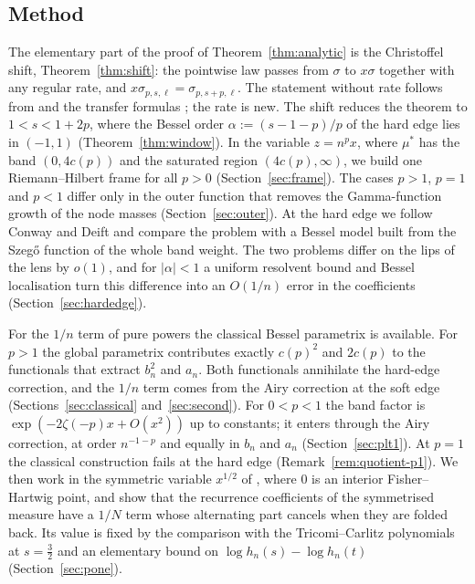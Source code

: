 \subsection{Method}\label{sec:strategy}
The elementary part of the proof of Theorem~\ref{thm:analytic} is the Christoffel shift, Theorem~\ref{thm:shift}: the
pointwise law passes from $\sigma$ to $x\sigma$ together with any regular rate, and $x\sigma_{p,s,\ell}=\sigma_{p,s+p,\ell}$.
The statement without rate follows from \cite[Proposition~2.1]{DPQ} and the transfer formulas \cite[\S1]{DD}; the rate is
new. The shift reduces the theorem to $1<s<1+2p$, where the Bessel order $\alpha:=(s-1-p)/p$ of the hard edge lies in
$(-1,1)$ (Theorem~\ref{thm:window}). In the variable $z=n^px$, where $\mu^*$ has the band $(0,4c(p))$ and the saturated
region $(4c(p),\infty)$, we build one Riemann--Hilbert frame for all $p>0$ (Section~\ref{sec:frame}). The cases $p>1$, $p=1$ and $p<1$ differ only in the outer function that removes the
Gamma-function growth of the node masses (Section~\ref{sec:outer}). At the hard
edge we follow Conway and Deift and compare the problem with a Bessel model built from the Szeg\H{o} function of the
whole band weight. The two problems differ on the lips of the lens by $o(1)$, and for $|\alpha|<1$ a uniform resolvent
bound and Bessel localisation turn this difference into an $O(1/n)$ error in the coefficients
(Section~\ref{sec:hardedge}).

For the $1/n$ term of pure powers the classical Bessel parametrix is available. For $p>1$ the global parametrix
contributes exactly $c(p)^2$ and $2c(p)$ to the functionals that extract $b_n^2$ and $a_n$. Both functionals annihilate
the hard-edge correction, and the $1/n$ term comes from the Airy correction at the soft edge
(Sections~\ref{sec:classical} and~\ref{sec:second}). For $0<p<1$ the band factor is $\exp(-2\zeta(-p)x+O(x^2))$ up to constants; it enters
through the Airy correction, at order $n^{-1-p}$ and equally in $b_n$ and $a_n$ (Section~\ref{sec:plt1}). At $p=1$ the
classical construction fails at the hard edge (Remark~\ref{rem:quotient-p1}). We then work in the symmetric variable
$x^{1/2}$ of \cite{WLXZ}, where $0$ is an interior Fisher--Hartwig point, and show that the recurrence coefficients of the
symmetrised measure have a $1/N$ term whose alternating part cancels when they are folded back. Its value is fixed by the
comparison with the Tricomi--Carlitz polynomials at $s=\frac32$ and an elementary bound on $\log h_n(s)-\log h_n(t)$
(Section~\ref{sec:pone}).

